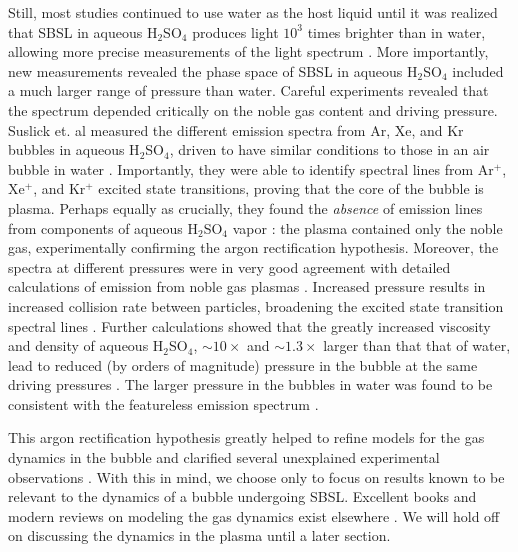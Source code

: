 \documentclass[rmp,aps,nofootinbib,superscriptaddress,floatfix]{revtex4-2}
\begin{document}
Still, most studies continued to use water as the host liquid until it was realized that SBSL in aqueous H$_2$SO$_4$ produces light $10^3$ times brighter than in water, allowing more precise measurements of the light spectrum \cite{}. More importantly, new measurements revealed the phase space of SBSL in aqueous H$_2$SO$_4$ included a much larger range of pressure than water. Careful experiments revealed that the spectrum depended critically on the noble gas content and driving pressure. Suslick et. al measured the different emission spectra from Ar, Xe, and Kr bubbles in aqueous H$_2$SO$_4$, driven to have similar conditions to those in an air bubble in water \cite{flannigan2005plasma,flannigan2006measurement,suslick2008inside}. Importantly, they were able to identify spectral lines from Ar$^+$, Xe$^+$, and Kr$^+$ excited state transitions, proving that the core of the bubble is plasma. Perhaps equally as crucially, they found the \emph{absence} of emission lines from components of aqueous H$_2$SO$_4$ vapor \cite{suslick2008inside,flannigan2006measurement,flannigan2006measurement}: the plasma contained only the noble gas, experimentally confirming the argon rectification hypothesis. Moreover, the spectra at different pressures were in very good agreement with detailed calculations of emission from noble gas plasmas \cite{an2009diagnosing,an2008spectral}. Increased pressure results in increased collision rate between particles, broadening the excited state transition spectral lines \cite{an2008spectral,suslick2008inside,flannigan2005plasma,flannigan2006measurement}. Further calculations showed that the greatly increased viscosity and density of aqueous H$_2$SO$_4$, $\sim 10 \times$ and $\sim 1.3 \times$ larger than that that of water, lead to reduced (by orders of magnitude) pressure in the bubble at the same driving pressures \cite{an2009diagnosing}. The larger pressure in the bubbles in water was found to be consistent with the featureless emission spectrum \cite{suslick2008inside,yasui2018acoustic}.

This argon rectification hypothesis greatly helped to refine models for the gas dynamics in the bubble and clarified several unexplained experimental observations \cite{suslick2008inside,brenner2002single}. With this in mind, we choose only to focus on results known to be relevant to the dynamics of a bubble undergoing SBSL. Excellent books and modern reviews on modeling the gas dynamics exist elsewhere \cite{brenner2002single,yasui2018acoustic,brennen2014cavitation}. We will hold off on discussing the dynamics in the plasma until a later section. 
\end{document}
